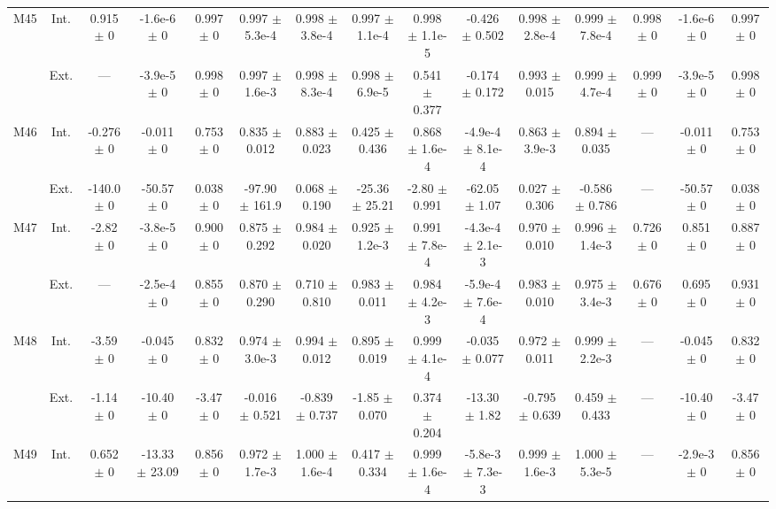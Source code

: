 \begin{table}[htbp]
{\begin{tabular}{@{}ccccccccccccccc@{}}
\cline{2-15}
\multirow{2}{*}{M45} & Int. & 0.915 $\pm$ 0 & -1.6e-6 $\pm$ 0 & 0.997 $\pm$ 0 & 0.997 $\pm$ 5.3e-4 & 0.998 $\pm$ 3.8e-4 & 0.997 $\pm$ 1.1e-4 & 0.998 $\pm$ 1.1e-5 & -0.426 $\pm$ 0.502 & 0.998 $\pm$ 2.8e-4 & 0.999 $\pm$ 7.8e-4 & 0.998 $\pm$ 0 & -1.6e-6 $\pm$ 0 & 0.997 $\pm$ 0 \\
 & Ext. & --- & -3.9e-5 $\pm$ 0 & 0.998 $\pm$ 0 & 0.997 $\pm$ 1.6e-3 & 0.998 $\pm$ 8.3e-4 & 0.998 $\pm$ 6.9e-5 & 0.541 $\pm$ 0.377 & -0.174 $\pm$ 0.172 & 0.993 $\pm$ 0.015 & 0.999 $\pm$ 4.7e-4 & 0.999 $\pm$ 0 & -3.9e-5 $\pm$ 0 & 0.998 $\pm$ 0 \\
\cline{2-15}
\multirow{2}{*}{M46} & Int. & -0.276 $\pm$ 0 & -0.011 $\pm$ 0 & 0.753 $\pm$ 0 & 0.835 $\pm$ 0.012 & 0.883 $\pm$ 0.023 & 0.425 $\pm$ 0.436 & 0.868 $\pm$ 1.6e-4 & -4.9e-4 $\pm$ 8.1e-4 & 0.863 $\pm$ 3.9e-3 & 0.894 $\pm$ 0.035 & --- & -0.011 $\pm$ 0 & 0.753 $\pm$ 0 \\
 & Ext. & -140.0 $\pm$ 0 & -50.57 $\pm$ 0 & 0.038 $\pm$ 0 & -97.90 $\pm$ 161.9 & 0.068 $\pm$ 0.190 & -25.36 $\pm$ 25.21 & -2.80 $\pm$ 0.991 & -62.05 $\pm$ 1.07 & 0.027 $\pm$ 0.306 & -0.586 $\pm$ 0.786 & --- & -50.57 $\pm$ 0 & 0.038 $\pm$ 0 \\
\cline{2-15}
\multirow{2}{*}{M47} & Int. & -2.82 $\pm$ 0 & -3.8e-5 $\pm$ 0 & 0.900 $\pm$ 0 & 0.875 $\pm$ 0.292 & 0.984 $\pm$ 0.020 & 0.925 $\pm$ 1.2e-3 & 0.991 $\pm$ 7.8e-4 & -4.3e-4 $\pm$ 2.1e-3 & 0.970 $\pm$ 0.010 & 0.996 $\pm$ 1.4e-3 & 0.726 $\pm$ 0 & 0.851 $\pm$ 0 & 0.887 $\pm$ 0 \\
 & Ext. & --- & -2.5e-4 $\pm$ 0 & 0.855 $\pm$ 0 & 0.870 $\pm$ 0.290 & 0.710 $\pm$ 0.810 & 0.983 $\pm$ 0.011 & 0.984 $\pm$ 4.2e-3 & -5.9e-4 $\pm$ 7.6e-4 & 0.983 $\pm$ 0.010 & 0.975 $\pm$ 3.4e-3 & 0.676 $\pm$ 0 & 0.695 $\pm$ 0 & 0.931 $\pm$ 0 \\
\cline{2-15}
\multirow{2}{*}{M48} & Int. & -3.59 $\pm$ 0 & -0.045 $\pm$ 0 & 0.832 $\pm$ 0 & 0.974 $\pm$ 3.0e-3 & 0.994 $\pm$ 0.012 & 0.895 $\pm$ 0.019 & 0.999 $\pm$ 4.1e-4 & -0.035 $\pm$ 0.077 & 0.972 $\pm$ 0.011 & 0.999 $\pm$ 2.2e-3 & --- & -0.045 $\pm$ 0 & 0.832 $\pm$ 0 \\
 & Ext. & -1.14 $\pm$ 0 & -10.40 $\pm$ 0 & -3.47 $\pm$ 0 & -0.016 $\pm$ 0.521 & -0.839 $\pm$ 0.737 & -1.85 $\pm$ 0.070 & 0.374 $\pm$ 0.204 & -13.30 $\pm$ 1.82 & -0.795 $\pm$ 0.639 & 0.459 $\pm$ 0.433 & --- & -10.40 $\pm$ 0 & -3.47 $\pm$ 0 \\
\cline{2-15}
\multirow{2}{*}{M49} & Int. & 0.652 $\pm$ 0 & -13.33 $\pm$ 23.09 & 0.856 $\pm$ 0 & 0.972 $\pm$ 1.7e-3 & 1.000 $\pm$ 1.6e-4 & 0.417 $\pm$ 0.334 & 0.999 $\pm$ 1.6e-4 & -5.8e-3 $\pm$ 7.3e-3 & 0.999 $\pm$ 1.6e-3 & 1.000 $\pm$ 5.3e-5 & --- & -2.9e-3 $\pm$ 0 & 0.856 $\pm$ 0 \\

\end{tabular}}
\end{table}
